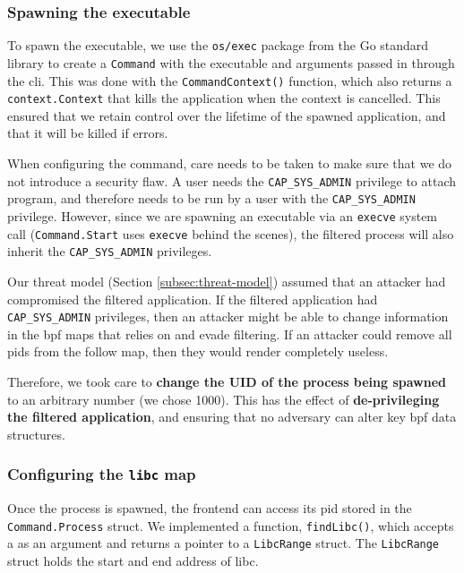 \subsubsection{Spawning the executable} \label{subsubsec:spawning-exec}

To spawn the executable, we use the \texttt{os/exec} package from the Go
standard library to create a \texttt{Command} with the executable and arguments
passed in through the \ac{cli}. This was done with the \texttt{CommandContext()}
function, which also returns a \texttt{context.Context} that kills the
application when the context is cancelled. This ensured that we retain control
over the lifetime of the spawned application, and that it will be killed if \af
errors.

When configuring the command, care needs to be taken to make sure that we do not 
introduce a security flaw. A user needs the \texttt{CAP\_SYS\_ADMIN} privilege
to attach  program, and therefore \af needs to be run by a user with
the \texttt{CAP\_SYS\_ADMIN} privilege. However, since we are spawning an
executable via an \texttt{execve} system call (\texttt{Command.Start} uses
\texttt{execve} behind the scenes), the filtered process will also inherit the
\texttt{CAP\_SYS\_ADMIN} privileges.

Our threat model (Section \ref{subsec:threat-model}) assumed that an attacker
had compromised the filtered application. If the filtered application had
\texttt{CAP\_SYS\_ADMIN} privileges, then an attacker might be able to change
information in the \ac{bpf} maps that \af relies on and evade filtering. If an
attacker could remove all \acp{pid} from the follow map, then they would render
\af completely useless. 

Therefore, we took care to \textbf{change the UID of the process being spawned}
to an arbitrary number (we chose 1000). This has the effect of
\textbf{de-privileging the filtered application}, and ensuring that no adversary
can alter key \ac{bpf} data structures.


\subsubsection{Configuring the \texttt{libc} map}
Once the process is spawned, the frontend can access its \ac{pid} stored in the
\texttt{Command.Process} struct. We implemented a function, 
\texttt{findLibc()}, which accepts a  as an argument and returns a pointer to 
a \texttt{LibcRange}  struct. The \texttt{LibcRange} struct holds the start and end 
address of \ac{libc}.

